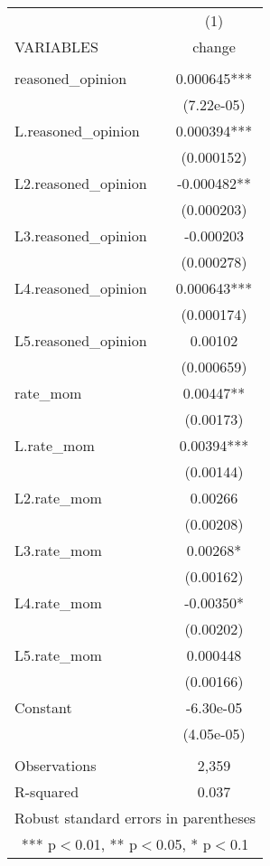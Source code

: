 \documentclass[]{article}
\begin{document}
\begin{tabular}{lc} \hline
 & (1) \\
VARIABLES & change \\ \hline
 &  \\
reasoned\_opinion & 0.000645*** \\
 & (7.22e-05) \\
L.reasoned\_opinion & 0.000394*** \\
 & (0.000152) \\
L2.reasoned\_opinion & -0.000482** \\
 & (0.000203) \\
L3.reasoned\_opinion & -0.000203 \\
 & (0.000278) \\
L4.reasoned\_opinion & 0.000643*** \\
 & (0.000174) \\
L5.reasoned\_opinion & 0.00102 \\
 & (0.000659) \\
rate\_mom & 0.00447** \\
 & (0.00173) \\
L.rate\_mom & 0.00394*** \\
 & (0.00144) \\
L2.rate\_mom & 0.00266 \\
 & (0.00208) \\
L3.rate\_mom & 0.00268* \\
 & (0.00162) \\
L4.rate\_mom & -0.00350* \\
 & (0.00202) \\
L5.rate\_mom & 0.000448 \\
 & (0.00166) \\
Constant & -6.30e-05 \\
 & (4.05e-05) \\
 &  \\
Observations & 2,359 \\
 R-squared & 0.037 \\ \hline
\multicolumn{2}{c}{ Robust standard errors in parentheses} \\
\multicolumn{2}{c}{ *** p$<$0.01, ** p$<$0.05, * p$<$0.1} \\
\end{tabular}
\end{document}
